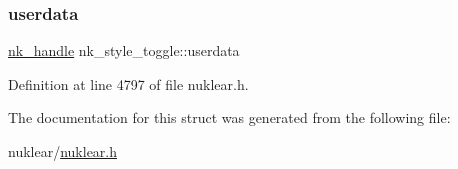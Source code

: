 \mbox{\label{structnk__style__toggle_ac3df28dd0fd8945d9d4effbd0953c957}} 
\subsubsection{\texorpdfstring{userdata}{userdata}}
{\footnotesize\ttfamily \mbox{\hyperlink{unionnk__handle}{nk\+\_\+handle}} nk\+\_\+style\+\_\+toggle\+::userdata}



Definition at line 4797 of file nuklear.\+h.



The documentation for this struct was generated from the following file\+:\begin{DoxyCompactItemize}
\item 
nuklear/\mbox{\hyperlink{nuklear_8h}{nuklear.\+h}}\end{DoxyCompactItemize}

